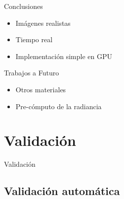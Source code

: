 \documentclass[spanish]{beamer}
\begin{document}








\begin{frame}{Conclusiones}
\begin{itemize}
\item Imágenes realistas
\item Tiempo real
\item Implementación simple en GPU
\end{itemize}

\begin{block}{Trabajos a Futuro}
\begin{itemize}
\item Otros materiales
\item Pre-cómputo de la radiancia
\end{itemize}
\end{block}
\end{frame}

\section{Validación}



\begin{frame}
\begin{block}{}
\begin{center}
\vspace{1cm}
\huge{Validación}
\vspace{1cm}
\end{center}
\end{block}
\end{frame}


\subsection{Validación automática}
\end{document}

